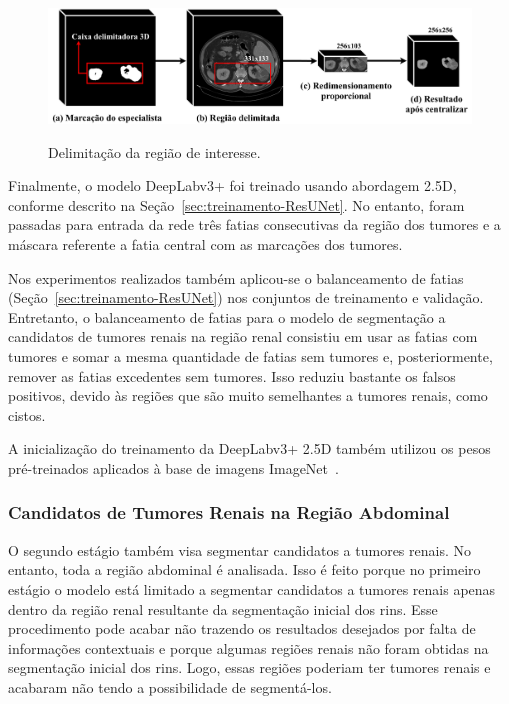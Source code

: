 \begin{figure}[!ht]
    \centering
    \caption{Delimitação da região de interesse.}
    \includegraphics[width=1\textwidth]{figuras/recorte.pdf}
    \label{fig:recorte}
\end{figure}

Finalmente, o modelo DeepLabv3+ foi treinado usando abordagem 2.5D, conforme descrito na Seção~\ref{sec:treinamento-ResUNet}. No entanto, foram passadas para entrada da rede três fatias consecutivas da região dos tumores e a máscara referente a fatia central com as marcações dos tumores.

Nos experimentos realizados também aplicou-se o balanceamento de fatias (Seção~\ref{sec:treinamento-ResUNet}) nos conjuntos de treinamento e validação. Entretanto, o balanceamento de fatias para o modelo de segmentação a candidatos de tumores renais na região renal consistiu em usar as fatias com tumores e somar a mesma quantidade de fatias sem tumores e, posteriormente, remover as fatias excedentes sem tumores. Isso reduziu bastante os falsos positivos, devido às regiões que são muito semelhantes a tumores renais, como cistos.


A inicialização do treinamento da DeepLabv3+ 2.5D também utilizou os pesos pré-treinados aplicados à base de imagens ImageNet~\cite{deng2009imagenet}.


\subsubsection{Candidatos de Tumores Renais na Região Abdominal}
\label{sec:metodo-candidatos-tumores-renais-regiao-abdominal}

O segundo estágio também visa segmentar candidatos a tumores renais. No entanto, toda a região abdominal é analisada. Isso é feito porque no primeiro estágio o modelo está limitado a segmentar candidatos a tumores renais apenas dentro da região renal resultante da segmentação inicial dos rins. Esse procedimento pode acabar não trazendo os resultados desejados por falta de informações contextuais e porque algumas regiões renais não foram obtidas na segmentação inicial dos rins. Logo, essas regiões poderiam ter tumores renais e acabaram não tendo a possibilidade de segmentá-los.

